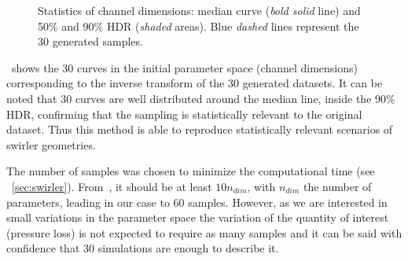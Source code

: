 \begin{figure}[!h]
\centering
{}
\caption{Statistics of channel dimensions: median curve (\emph{bold solid} line) and 50\% and 90\% HDR (\emph{shaded} areas). Blue \emph{dashed} lines represent the 30 generated samples.}
\label{fig:samples}
\end{figure}

~shows the 30 curves in the initial parameter space (channel dimensions) corresponding to the inverse transform of the 30 generated datasets. It can be noted that 30 curves are well distributed around the median line, inside the 90\% HDR, confirming that the sampling is statistically relevant to the original dataset. Thus this method is able to reproduce statistically relevant scenarios of swirler geometries.

The number of samples was chosen to minimize the computational time (see ~\cref{sec:swirler}). From~\cite{Forrester2007}, it should be at least $10 n_{dim}$, with $n_{dim}$ the number of parameters, leading in our case to 60 samples. However, as we are interested in small variations in the parameter space the variation of the quantity of interest (pressure loss) is not expected to require as many samples and it can be said with confidence that 30 simulations are enough to describe it.

